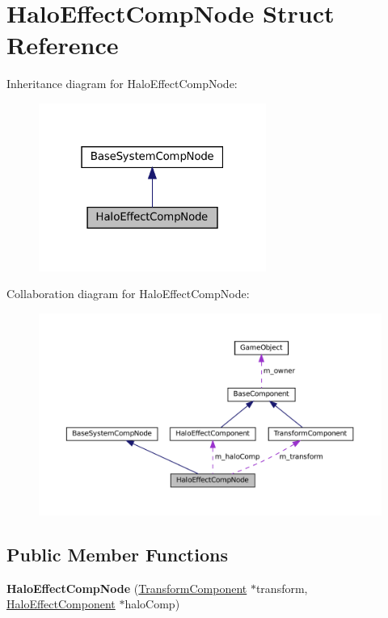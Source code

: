 \hypertarget{structHaloEffectCompNode}{}\section{Halo\+Effect\+Comp\+Node Struct Reference}
\label{structHaloEffectCompNode}


Inheritance diagram for Halo\+Effect\+Comp\+Node\+:
\nopagebreak
\begin{figure}[H]
\begin{center}
\leavevmode
\includegraphics[width=211pt]{structHaloEffectCompNode__inherit__graph}
\end{center}
\end{figure}


Collaboration diagram for Halo\+Effect\+Comp\+Node\+:
\nopagebreak
\begin{figure}[H]
\begin{center}
\leavevmode
\includegraphics[width=350pt]{structHaloEffectCompNode__coll__graph}
\end{center}
\end{figure}
\subsection*{Public Member Functions}
\begin{DoxyCompactItemize}
\item 
\mbox{\label{structHaloEffectCompNode_a3773e9541d9aa7d2b8f4410fadfa643d}} 
{\bfseries Halo\+Effect\+Comp\+Node} (\hyperlink{classTransformComponent}{Transform\+Component} $\ast$transform, \hyperlink{classHaloEffectComponent}{Halo\+Effect\+Component} $\ast$halo\+Comp)
\end{DoxyCompactItemize}
